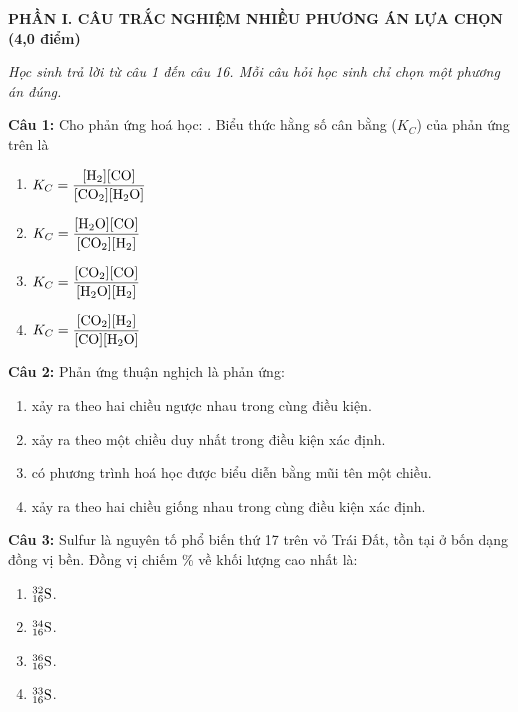 \documentclass[10.5pt,a4paper]{article}
\begin{document}
{\color{myGreen}\large\bfseries PHẦN I. CÂU TRẮC NGHIỆM NHIỀU PHƯƠNG ÁN LỰA CHỌN (4,0 điểm)}

\textit{Học sinh trả lời từ câu 1 đến câu 16. Mỗi câu hỏi học sinh chỉ chọn một phương án đúng.}

\vspace{2pt}
\textbf{Câu 1:} Cho phản ứng hoá học: . Biểu thức hằng số cân bằng ($K_C$) của phản ứng trên là
\begin{enumerate}[label=\textbf{\Alph*.}, itemsep=1pt, topsep=1pt, leftmargin=1.5cm]
    \item $K_C = \dfrac{[\ce{H2}][\ce{CO}]}{[\ce{CO2}][\ce{H2O}]}$ \hfill \item $K_C = \dfrac{[\ce{H2O}][\ce{CO}]}{[\ce{CO2}][\ce{H2}]}$ \hfill \item $K_C = \dfrac{[\ce{CO2}][\ce{CO}]}{[\ce{H2O}][\ce{H2}]}$ \hfill \item $K_C = \dfrac{[\ce{CO2}][\ce{H2}]}{[\ce{CO}][\ce{H2O}]}$
\end{enumerate}

\textbf{Câu 2:} Phản ứng thuận nghịch là phản ứng:
\begin{enumerate}[label=\textbf{\Alph*.}, itemsep=1pt, topsep=1pt, leftmargin=1.5cm]
    \item xảy ra theo hai chiều ngược nhau trong cùng điều kiện.
    \item xảy ra theo một chiều duy nhất trong điều kiện xác định.
    \item có phương trình hoá học được biểu diễn bằng mũi tên một chiều.
    \item xảy ra theo hai chiều giống nhau trong cùng điều kiện xác định.
\end{enumerate}

\textbf{Câu 3:} Sulfur là nguyên tố phổ biến thứ 17 trên vỏ Trái Đất, tồn tại ở bốn dạng đồng vị bền. Đồng vị chiếm \% về khối lượng cao nhất là:
\begin{enumerate}[label=\textbf{\Alph*.}, itemsep=1pt, topsep=1pt, leftmargin=1.5cm]
    \item $^{32}_{16}\ce{S}$. \hfill \item $^{34}_{16}\ce{S}$. \hfill \item $^{36}_{16}\ce{S}$. \hfill \item $^{33}_{16}\ce{S}$.
\end{enumerate}
\end{document}
